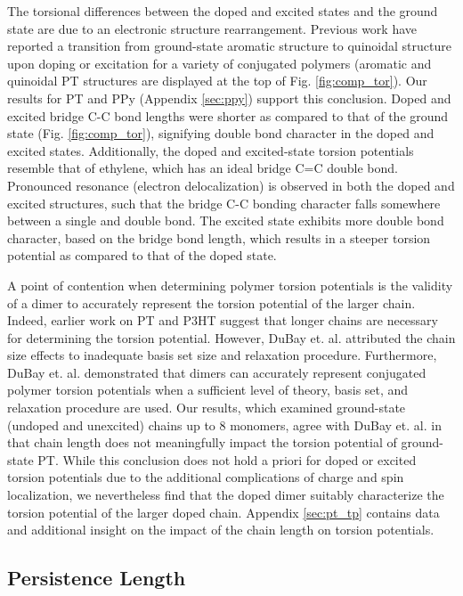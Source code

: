 The torsional differences between the doped and excited states and the ground state are due to an electronic structure rearrangement. Previous work have reported a transition from ground-state aromatic structure to quinoidal structure upon doping or excitation for a variety of conjugated polymers (aromatic and quinoidal PT structures are displayed at the top of Fig. \ref{fig:comp_tor}).\cite{Roth2013_ch5, Burrezo2017, Wells2008, Aime1989, Banerji2011, Roseli2017, Busby2011, Yu2014, Fonner2010, Baitoul2000, Bradley1989} Our results for PT and PPy (Appendix \ref{sec:ppy}) support this conclusion. Doped and excited bridge C-C bond lengths were shorter as compared to that of the ground state (Fig. \ref{fig:comp_tor}), signifying double bond character in the doped and excited states. Additionally, the doped and excited-state torsion potentials resemble that of ethylene, which has an ideal bridge C=C double bond.\cite{Shao2003} Pronounced resonance (electron delocalization) is observed in both the doped and excited structures, such that the bridge C-C bonding character falls somewhere between a single and double bond. The excited state exhibits more double bond character, based on the bridge bond length, which results in a steeper torsion potential as compared to that of the doped state.

A point of contention when determining polymer torsion potentials is the validity of a dimer to accurately represent the torsion potential of the larger chain. Indeed, earlier work on PT and P3HT suggest that longer chains are necessary for determining the torsion potential.\cite{Darling2009} However, DuBay et. al. attributed the chain size effects to inadequate basis set size and relaxation procedure. Furthermore, DuBay et. al. demonstrated that dimers can accurately represent conjugated polymer torsion potentials when a sufficient level of theory, basis set, and relaxation procedure are used.\cite{Dubay2012} Our results, which examined ground-state (undoped and unexcited) chains up to 8 monomers, agree with DuBay et. al. in that chain length does not meaningfully impact the torsion potential of ground-state PT. While this conclusion does not hold a priori for doped or excited torsion potentials due to the additional complications of charge and spin localization, we nevertheless find that the doped dimer suitably characterize the torsion potential of the larger doped chain. Appendix \ref{sec:pt_tp} contains data and additional insight on the impact of the chain length on torsion potentials.

\subsection{Persistence Length}

